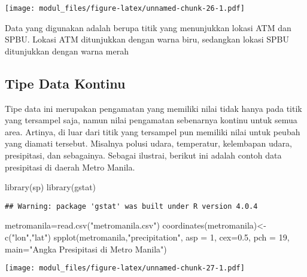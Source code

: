 \documentclass[
]{book}
\newenvironment{Shaded}{\begin{snugshade}}{\end{snugshade}}
\newcommand{\AttributeTok}[1]{\textcolor[rgb]{0.77,0.63,0.00}{#1}}
\newcommand{\DecValTok}[1]{\textcolor[rgb]{0.00,0.00,0.81}{#1}}
\newcommand{\FloatTok}[1]{\textcolor[rgb]{0.00,0.00,0.81}{#1}}
\newcommand{\FunctionTok}[1]{\textcolor[rgb]{0.00,0.00,0.00}{#1}}
\newcommand{\NormalTok}[1]{#1}
\newcommand{\OtherTok}[1]{\textcolor[rgb]{0.56,0.35,0.01}{#1}}
\newcommand{\StringTok}[1]{\textcolor[rgb]{0.31,0.60,0.02}{#1}}
\begin{document}
\texttt{[image: modul\_files/figure-latex/unnamed-chunk-26-1.pdf]}

Data yang digunakan adalah berupa titik yang menunjukkan lokasi ATM dan SPBU. Lokasi ATM ditunjukkan dengan warna biru, sedangkan lokasi SPBU ditunjukkan dengan warna merah

\hypertarget{tipe-data-kontinu}{%
\subsection{Tipe Data Kontinu}\label{tipe-data-kontinu}}

Tipe data ini merupakan pengamatan yang memiliki nilai tidak hanya pada titik yang tersampel saja, namun nilai pengamatan sebenarnya kontinu untuk semua area. Artinya, di luar dari titik yang tersampel pun memiliki nilai untuk peubah yang diamati tersebut. Misalnya polusi udara, temperatur, kelembapan udara, presipitasi, dan sebagainya. Sebagai ilustrai, berikut ini adalah contoh data presipitasi di daerah Metro Manila.

\begin{Shaded}
\begin{Highlighting}[]
\FunctionTok{library}\NormalTok{(sp)}
\FunctionTok{library}\NormalTok{(gstat)}
\end{Highlighting}
\end{Shaded}

\begin{verbatim}
## Warning: package 'gstat' was built under R version 4.0.4
\end{verbatim}

\begin{Shaded}
\begin{Highlighting}[]
\NormalTok{metromanila}\OtherTok{=}\FunctionTok{read.csv}\NormalTok{(}\StringTok{"metromanila.csv"}\NormalTok{)}
\FunctionTok{coordinates}\NormalTok{(metromanila)}\OtherTok{\textless{}{-}}\FunctionTok{c}\NormalTok{(}\StringTok{"lon"}\NormalTok{,}\StringTok{"lat"}\NormalTok{)}
\FunctionTok{spplot}\NormalTok{(metromanila,}\StringTok{"precipitation"}\NormalTok{, }\AttributeTok{asp =} \DecValTok{1}\NormalTok{,}
       \AttributeTok{cex=}\FloatTok{0.5}\NormalTok{, }\AttributeTok{pch =} \DecValTok{19}\NormalTok{, }\AttributeTok{main=}\StringTok{"Angka Presipitasi di Metro Manila"}\NormalTok{)}
\end{Highlighting}
\end{Shaded}

\texttt{[image: modul\_files/figure-latex/unnamed-chunk-27-1.pdf]}
\end{document}

